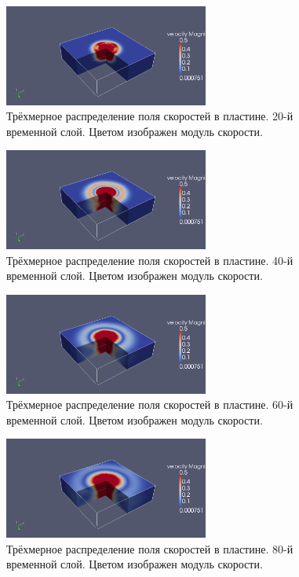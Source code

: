 \begin{figure}[htp]
\centering
\includegraphics[width=0.6\textwidth]{png/strike-test/plate-3d-v/0020.png}
\caption{Трёхмерное распределение поля скоростей в пластине. 20-й временной слой. Цветом изображен модуль скорости.}
\end{figure}

\begin{figure}[htp]
\centering
\includegraphics[width=0.6\textwidth]{png/strike-test/plate-3d-v/0040.png}
\caption{Трёхмерное распределение поля скоростей в пластине. 40-й временной слой. Цветом изображен модуль скорости.}
\end{figure}

\begin{figure}[htp]
\centering
\includegraphics[width=0.6\textwidth]{png/strike-test/plate-3d-v/0060.png}
\caption{Трёхмерное распределение поля скоростей в пластине. 60-й временной слой. Цветом изображен модуль скорости.}
\end{figure}

\begin{figure}[htp]
\centering
\includegraphics[width=0.6\textwidth]{png/strike-test/plate-3d-v/0080.png}
\caption{Трёхмерное распределение поля скоростей в пластине. 80-й временной слой. Цветом изображен модуль скорости.}
\end{figure}

